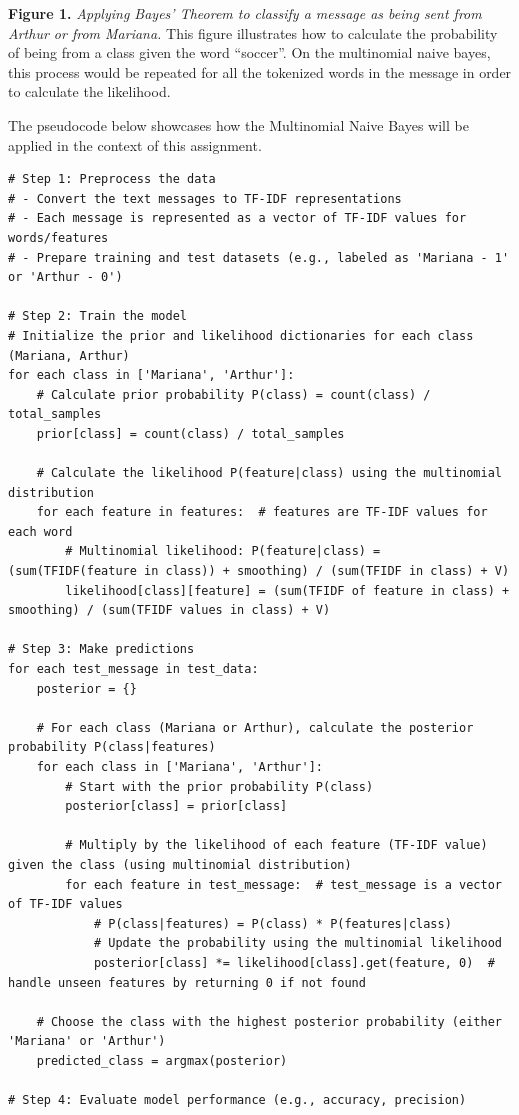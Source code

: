 \documentclass[11pt]{article}
\begin{document}
\textbf{Figure 1.} \emph{Applying Bayes' Theorem to classify a message
as being sent from Arthur or from Mariana.} This figure illustrates how
to calculate the probability of being from a class given the word
``soccer''. On the multinomial naive bayes, this process would be
repeated for all the tokenized words in the message in order to
calculate the likelihood.

The pseudocode below showcases how the Multinomial Naive Bayes will be
applied in the context of this assignment.

    \begin{verbatim}
# Step 1: Preprocess the data
# - Convert the text messages to TF-IDF representations
# - Each message is represented as a vector of TF-IDF values for words/features
# - Prepare training and test datasets (e.g., labeled as 'Mariana - 1' or 'Arthur - 0')

# Step 2: Train the model
# Initialize the prior and likelihood dictionaries for each class (Mariana, Arthur)
for each class in ['Mariana', 'Arthur']:
    # Calculate prior probability P(class) = count(class) / total_samples
    prior[class] = count(class) / total_samples
    
    # Calculate the likelihood P(feature|class) using the multinomial distribution
    for each feature in features:  # features are TF-IDF values for each word
        # Multinomial likelihood: P(feature|class) = (sum(TFIDF(feature in class)) + smoothing) / (sum(TFIDF in class) + V)
        likelihood[class][feature] = (sum(TFIDF of feature in class) + smoothing) / (sum(TFIDF values in class) + V)

# Step 3: Make predictions
for each test_message in test_data:
    posterior = {}
    
    # For each class (Mariana or Arthur), calculate the posterior probability P(class|features)
    for each class in ['Mariana', 'Arthur']:
        # Start with the prior probability P(class)
        posterior[class] = prior[class]
        
        # Multiply by the likelihood of each feature (TF-IDF value) given the class (using multinomial distribution)
        for each feature in test_message:  # test_message is a vector of TF-IDF values
            # P(class|features) = P(class) * P(features|class)
            # Update the probability using the multinomial likelihood
            posterior[class] *= likelihood[class].get(feature, 0)  # handle unseen features by returning 0 if not found
    
    # Choose the class with the highest posterior probability (either 'Mariana' or 'Arthur')
    predicted_class = argmax(posterior)
    
# Step 4: Evaluate model performance (e.g., accuracy, precision)
\end{verbatim}
\end{document}
